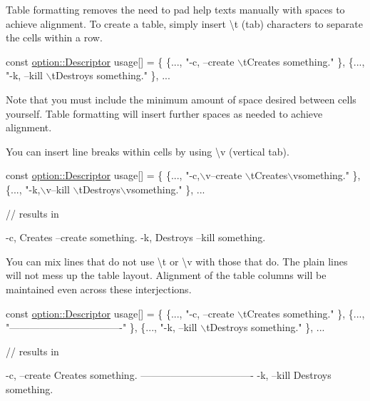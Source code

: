 Table formatting removes the need to pad help texts manually with spaces to achieve alignment. To create a table, simply insert \textbackslash{}t (tab) characters to separate the cells within a row.


\begin{DoxyCode}
\textcolor{keyword}{const} \hyperlink{structoption_1_1Descriptor}{option::Descriptor} usage[] = \{
\{..., \textcolor{stringliteral}{"-c, --create  \(\backslash\)tCreates something."} \},
\{..., \textcolor{stringliteral}{"-k, --kill  \(\backslash\)tDestroys something."} \}, ...
\end{DoxyCode}


Note that you must include the minimum amount of space desired between cells yourself. Table formatting will insert further spaces as needed to achieve alignment.

You can insert line breaks within cells by using \textbackslash{}v (vertical tab).


\begin{DoxyCode}
\textcolor{keyword}{const} \hyperlink{structoption_1_1Descriptor}{option::Descriptor} usage[] = \{
\{..., \textcolor{stringliteral}{"-c,\(\backslash\)v--create  \(\backslash\)tCreates\(\backslash\)vsomething."} \},
\{..., \textcolor{stringliteral}{"-k,\(\backslash\)v--kill  \(\backslash\)tDestroys\(\backslash\)vsomething."} \}, ...

\textcolor{comment}{// results in}

-c,       Creates
--create  something.
-k,       Destroys
--kill    something.
\end{DoxyCode}


You can mix lines that do not use \textbackslash{}t or \textbackslash{}v with those that do. The plain lines will not mess up the table layout. Alignment of the table columns will be maintained even across these interjections.


\begin{DoxyCode}
\textcolor{keyword}{const} \hyperlink{structoption_1_1Descriptor}{option::Descriptor} usage[] = \{
\{..., \textcolor{stringliteral}{"-c, --create  \(\backslash\)tCreates something."} \},
\{..., \textcolor{stringliteral}{"----------------------------------"} \},
\{..., \textcolor{stringliteral}{"-k, --kill  \(\backslash\)tDestroys something."} \}, ...

\textcolor{comment}{// results in}

-c, --create  Creates something.
----------------------------------
-k, --kill    Destroys something.
\end{DoxyCode}


